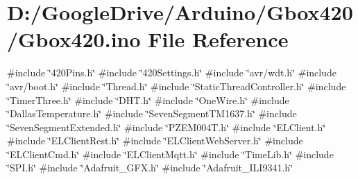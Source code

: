 \hypertarget{_gbox420_8ino}{}\section{D\+:/\+Google\+Drive/\+Arduino/\+Gbox420/\+Gbox420.ino File Reference}
\label{_gbox420_8ino}
{\ttfamily \#include \char`\"{}420\+Pins.\+h\char`\"{}}\newline
{\ttfamily \#include \char`\"{}420\+Settings.\+h\char`\"{}}\newline
{\ttfamily \#include \char`\"{}avr/wdt.\+h\char`\"{}}\newline
{\ttfamily \#include \char`\"{}avr/boot.\+h\char`\"{}}\newline
{\ttfamily \#include \char`\"{}Thread.\+h\char`\"{}}\newline
{\ttfamily \#include \char`\"{}Static\+Thread\+Controller.\+h\char`\"{}}\newline
{\ttfamily \#include \char`\"{}Timer\+Three.\+h\char`\"{}}\newline
{\ttfamily \#include \char`\"{}D\+H\+T.\+h\char`\"{}}\newline
{\ttfamily \#include \char`\"{}One\+Wire.\+h\char`\"{}}\newline
{\ttfamily \#include \char`\"{}Dallas\+Temperature.\+h\char`\"{}}\newline
{\ttfamily \#include \char`\"{}Seven\+Segment\+T\+M1637.\+h\char`\"{}}\newline
{\ttfamily \#include \char`\"{}Seven\+Segment\+Extended.\+h\char`\"{}}\newline
{\ttfamily \#include \char`\"{}P\+Z\+E\+M004\+T.\+h\char`\"{}}\newline
{\ttfamily \#include \char`\"{}E\+L\+Client.\+h\char`\"{}}\newline
{\ttfamily \#include \char`\"{}E\+L\+Client\+Rest.\+h\char`\"{}}\newline
{\ttfamily \#include \char`\"{}E\+L\+Client\+Web\+Server.\+h\char`\"{}}\newline
{\ttfamily \#include \char`\"{}E\+L\+Client\+Cmd.\+h\char`\"{}}\newline
{\ttfamily \#include \char`\"{}E\+L\+Client\+Mqtt.\+h\char`\"{}}\newline
{\ttfamily \#include \char`\"{}Time\+Lib.\+h\char`\"{}}\newline
{\ttfamily \#include \char`\"{}S\+P\+I.\+h\char`\"{}}\newline
{\ttfamily \#include \char`\"{}Adafruit\+\_\+\+G\+F\+X.\+h\char`\"{}}\newline
{\ttfamily \#include \char`\"{}Adafruit\+\_\+\+I\+L\+I9341.\+h\char`\"{}}\newline
